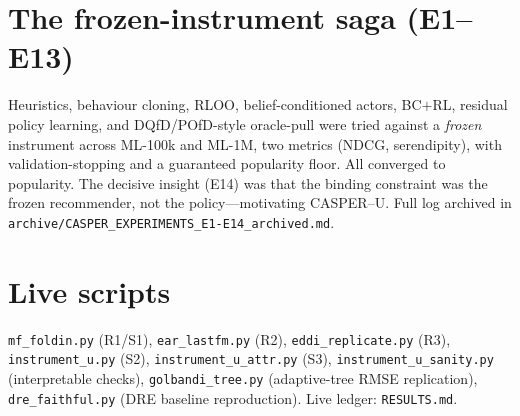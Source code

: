 \section{The frozen-instrument saga (E1--E13)}\label{app:saga}
Heuristics, behaviour cloning, RLOO, belief-conditioned actors, BC$+$RL, residual policy learning, and
DQfD/POfD-style oracle-pull were tried against a \emph{frozen} instrument across ML-100k and ML-1M, two metrics
(NDCG, serendipity), with validation-stopping and a guaranteed popularity floor. All converged to popularity. The
decisive insight (E14) was that the binding constraint was the frozen recommender, not the policy---motivating
CASPER--U. Full log archived in \texttt{archive/CASPER\_EXPERIMENTS\_E1-E14\_archived.md}.

\section{Live scripts}\label{app:scripts}
\texttt{mf\_foldin.py} (R1/S1), \texttt{ear\_lastfm.py} (R2), \texttt{eddi\_replicate.py} (R3),
\texttt{instrument\_u.py} (S2), \texttt{instrument\_u\_attr.py} (S3), \texttt{instrument\_u\_sanity.py}
(interpretable checks), \texttt{golbandi\_tree.py} (adaptive-tree RMSE replication), \texttt{dre\_faithful.py}
(DRE baseline reproduction). Live ledger: \texttt{RESULTS.md}.

